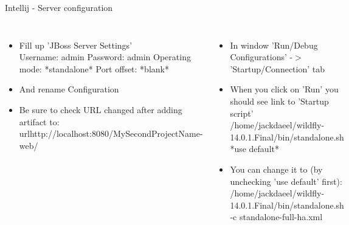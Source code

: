 \documentclass[aspectratio=1610,english]{beamer} %
\begin{document}
	\begin{frame}{Intellij - Server configuration}
		\begin{columns}
				
				\begin{itemize}
					\tiny
					\color{black}
					\item Fill up 'JBoss Server Settings' \\ 
						\color{gray}
						\fontsize{4}{5} \selectfont 
						Username: admin
						Password: admin
						Operating mode: *standalone*
						Port offset: *blank*
					\tiny
					\color{black}
					\item And rename Configuration 
					\item Be sure to check URL changed after adding artifact to: \\
						\color{gray}
						\fontsize{4}{5} \selectfont 
						url{http://localhost:8080/MySecondProjectName-web/}
				\end{itemize}
				
				\begin{minipage}{\textwidth}
				\end{minipage}
				
				\begin{itemize}
					\tiny
					\color{black}
					\item In window 'Run/Debug Configurations' -$>$ 'Startup/Connection' tab 
					\item When you click on 'Run' you should see link to 'Startup script' \\ 
						\color{gray}
						\fontsize{4}{5} \selectfont 
						/home/jackdaeel/wildfly-14.0.1.Final/bin/standalone.sh *use default* 
					\color{black}
					\tiny
					\item You can change it to (by unchecking 'use default' first):
						\color{gray}
						\fontsize{4}{5} \selectfont 
						/home/jackdaeel/wildfly-14.0.1.Final/bin/standalone.sh -c standalone-full-ha.xml
				\end{itemize}
			

\end{columns}
\end{frame}
\end{document}
